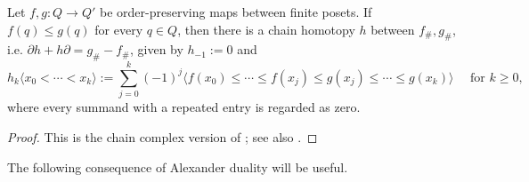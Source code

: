\documentclass[a4paper,leqno]{amsart}
\begin{document}
\begin{lem}\label{lem:order homotopy}
Let $f,g:Q\to Q'$ be order-preserving maps between finite posets.
If $f(q)\leq g(q)$ for every $q\in Q$, then there is a chain homotopy $h$ between $f_\#,g_\#$, i.e. $\partial h+h\partial=g_\#-f_\#$, given by $h_{-1}:=0$ and
\[
h_k\langle x_0<\cdots<x_k\rangle:=\sum_{j=0}^k(-1)^j\langle f(x_0)\leq\cdots\leq f(x_j)\leq g(x_j)\leq\cdots\leq g(x_k)\rangle\quad \text{ for }k\geq0,
\]
where every summand with a repeated entry is regarded as zero.
\end{lem}
\begin{proof}
This is the chain complex version of \cite[Theorem 10.11]{Bjo95}; see also \cite[Theorem 13.3]{Mun84}.  
\end{proof}


The following consequence of Alexander duality will be useful.
\end{document}
